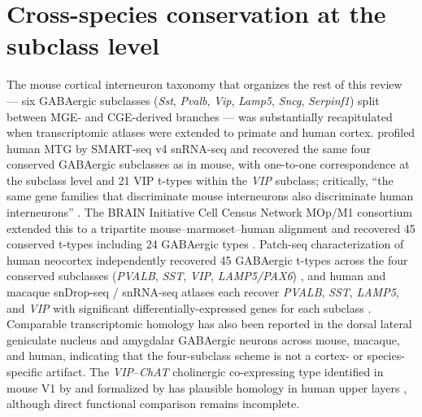 \documentclass[11pt]{article}
\begin{document}
\section{Cross-species conservation at the subclass level}

The mouse cortical interneuron taxonomy that organizes the rest of this
review --- six GABAergic subclasses (\textit{Sst}, \textit{Pvalb}, \textit{Vip}, \textit{Lamp5}, \textit{Sncg},
\textit{Serpinf1}) split between MGE- and CGE-derived branches
\citep{Tasic2018, Yao2021a, Tremblay2016, Rudy2011} --- was substantially
recapitulated when transcriptomic atlases were extended to primate and human
cortex. \citet{Hodge2019} profiled human MTG by SMART-seq v4 snRNA-seq and
recovered the same four conserved GABAergic subclasses as in mouse, with
one-to-one correspondence at the subclass level and 21 VIP t-types within the
\textit{VIP} subclass; critically, ``the same gene families that discriminate mouse
interneurons also discriminate human interneurons''
\citep{Hodge2019}. The BRAIN Initiative Cell Census Network MOp/M1
consortium extended this to a tripartite mouse--marmoset--human alignment and
recovered 45 conserved t-types including 24 GABAergic types
\citep{Braininitiativecellcensusnetworkbiccn2021, Bakken2021a}. Patch-seq
characterization of human neocortex independently recovered 45 GABAergic
t-types across the four conserved subclasses (\textit{PVALB}, \textit{SST}, \textit{VIP},
\textit{LAMP5/PAX6}) \citep{Lee2023a}, and human and macaque snDrop-seq /
snRNA-seq atlases each recover \textit{PVALB}, \textit{SST}, \textit{LAMP5}, and \textit{VIP} with
significant differentially-expressed genes for each subclass
\citep{Lake2018, Chen2023a}. Comparable transcriptomic homology has
also been reported in the dorsal lateral geniculate nucleus and amygdalar
GABAergic neurons across mouse, macaque, and human, indicating that the four-subclass scheme is
not a cortex- or species-specific artifact. The \textit{VIP}--\textit{ChAT} cholinergic
co-expressing type identified in mouse V1 by \citet{Tasic2016} and
formalized by \citet{Tasic2018} has plausible homology in human upper
layers \citep{Hodge2019, Lake2018, Lee2023a}, although direct functional
comparison remains incomplete.
\end{document}

